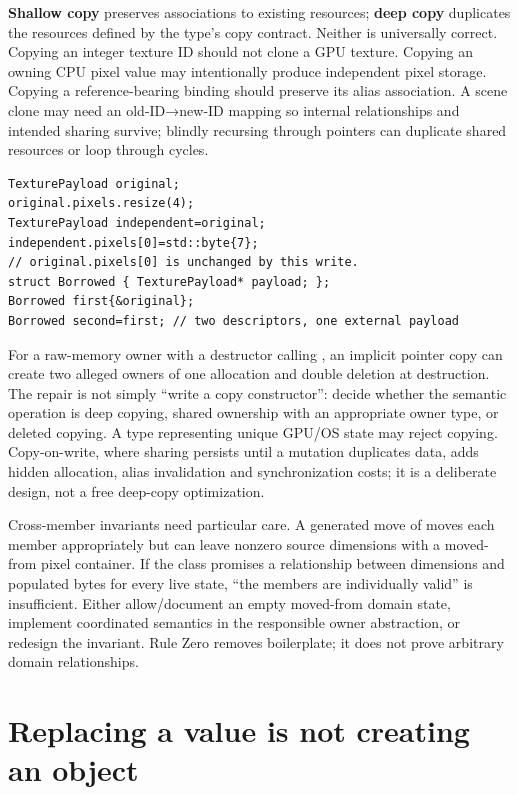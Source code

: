 \textbf{Shallow copy} preserves associations to existing resources; \textbf{deep copy} duplicates the resources defined by the type's copy contract. Neither is universally correct. Copying an integer texture ID should not clone a GPU texture. Copying an owning CPU pixel value may intentionally produce independent pixel storage. Copying a reference-bearing binding should preserve its alias association. A scene clone may need an old-ID→new-ID mapping so internal relationships and intended sharing survive; blindly recursing through pointers can duplicate shared resources or loop through cycles.

\begin{verbatim}
TexturePayload original;
original.pixels.resize(4);
TexturePayload independent=original;
independent.pixels[0]=std::byte{7};
// original.pixels[0] is unchanged by this write.
struct Borrowed { TexturePayload* payload; };
Borrowed first{&original};
Borrowed second=first; // two descriptors, one external payload
\end{verbatim}

For a raw-memory owner with a destructor calling , an implicit pointer copy can create two alleged owners of one allocation and double deletion at destruction. The repair is not simply ``write a copy constructor'': decide whether the semantic operation is deep copying, shared ownership with an appropriate owner type, or deleted copying. A type representing unique GPU/OS state may reject copying. Copy-on-write, where sharing persists until a mutation duplicates data, adds hidden allocation, alias invalidation and synchronization costs; it is a deliberate design, not a free deep-copy optimization.

Cross-member invariants need particular care. A generated move of  moves each member appropriately but can leave nonzero source dimensions with a moved-from pixel container. If the class promises a relationship between dimensions and populated bytes for every live state, ``the members are individually valid'' is insufficient. Either allow/document an empty moved-from domain state, implement coordinated semantics in the responsible owner abstraction, or redesign the invariant. Rule Zero removes boilerplate; it does not prove arbitrary domain relationships.

\section{Replacing a value is not creating an object}\label{05-engine-i-ch003-replacing-a-value-is-not-creating-an-object}

